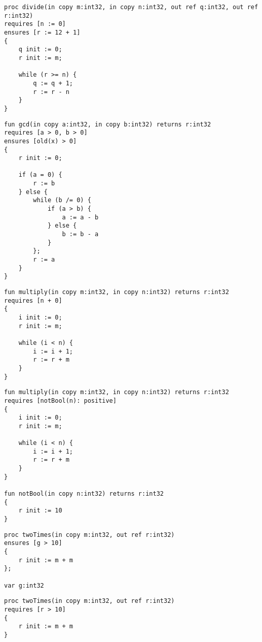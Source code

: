 \begin{lstlisting}[caption=Wert einer Variable in der pre-/postcondition ändern]
proc divide(in copy m:int32, in copy n:int32, out ref q:int32, out ref r:int32)
requires [n := 0]
ensures [r := 12 + 1]
{
    q init := 0;
    r init := m;

    while (r >= n) {
        q := q + 1;
        r := r - n
    }
}
\end{lstlisting}

\begin{lstlisting}[caption=Zugriff auf nicht vorhandene Variable in der old Funktion]
fun gcd(in copy a:int32, in copy b:int32) returns r:int32
requires [a > 0, b > 0]
ensures [old(x) > 0]
{
    r init := 0;
    
    if (a = 0) {
        r := b
    } else {
        while (b /= 0) {
            if (a > b) {
                a := a - b
            } else {
                b := b - a
            }
        };
        r := a
    }
}
\end{lstlisting}

\begin{lstlisting}[caption=Eine nicht Boolsche Expression in der Condition List]
fun multiply(in copy m:int32, in copy n:int32) returns r:int32
requires [n + 0]
{
    i init := 0;
    r init := m;

    while (i < n) {
        i := i + 1;
        r := r + m
    }
}
\end{lstlisting}

\begin{lstlisting}[caption=Eine Funktion in der Condition List welche keinen boolschen Wert zurückliefert]
fun multiply(in copy m:int32, in copy n:int32) returns r:int32
requires [notBool(n): positive]
{
    i init := 0;
    r init := m;

    while (i < n) {
        i := i + 1;
        r := r + m
    }
}

fun notBool(in copy n:int32) returns r:int32
{
    r init := 10
}
\end{lstlisting}

\begin{lstlisting}[caption=Beispiel mit Zugriff auf globale Variable welche nicht in der globalImportList importiert wurde]
proc twoTimes(in copy m:int32, out ref r:int32)
ensures [g > 10]
{
    r init := m + m
};

var g:int32

\end{lstlisting}

\begin{lstlisting}[caption=Zugriff auf out Parameter in precondition.]
proc twoTimes(in copy m:int32, out ref r:int32)
requires [r > 10]
{
    r init := m + m
}
\end{lstlisting}


